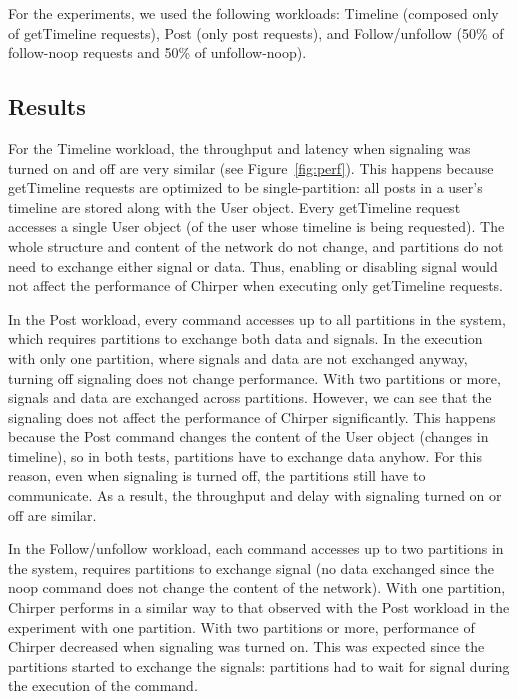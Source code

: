 \documentclass[11pt]{article}
\newcommand{\appname}{Chirper} %
\begin{document}
For the experiments, we used the following workloads:
Timeline (composed only of getTimeline requests),
Post (only post requests), and
Follow/unfollow (50\% of follow-noop requests and 50\% of unfollow-noop).

\label{sec:evaluation:setup}
\subsection{Results}


For the Timeline workload, the throughput and latency when signaling was turned on and off are very similar (see Figure~\ref{fig:perf}).
This happens because getTimeline requests are optimized to be single-partition:
all posts in a user's timeline are stored along with the User object.
Every getTimeline request accesses a single User object (of the user whose timeline is being requested).
The whole structure and content of the network do not change, and partitions do not need to exchange either signal or data.
Thus, enabling or disabling signal would not affect the performance of \appname{} when executing only getTimeline requests.

In the Post workload, every command accesses up to all partitions in the system, which requires partitions to exchange both data and signals.
In the execution with only one partition, where signals and data are not exchanged anyway, turning off signaling does not change performance.
With two partitions or more, signals and data are exchanged across partitions. 
However, we can see that the signaling does not affect the performance of \appname{} significantly. This happens because the Post command changes the content of the User object (changes in timeline), so in both tests, partitions have to exchange data anyhow. For this reason, even when signaling is turned off, the partitions still have to communicate. As a result, the throughput and delay with signaling turned on or off are similar.

In the Follow/unfollow workload, each command accesses up to two partitions in the system, requires partitions to exchange signal (no data exchanged since the noop command does not change the content of the network).
With one partition, \appname{} performs in a similar way to that observed with the Post workload in the experiment with one partition.
With two partitions or more, performance of \appname{} decreased when signaling was turned on. 
This was expected since the partitions started to exchange the signals: partitions had to wait for signal during the execution of the command.
\end{document}
